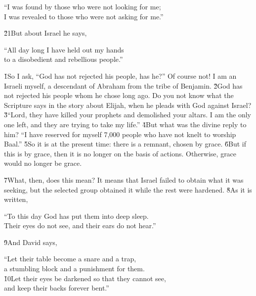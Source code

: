 \begin{poetry}
\poeml ``I was found by those who were not looking for me; \\
\poemll    I was revealed to those who were not asking for me.''
\end{poetry}

\v{21}But about Israel he says,

\begin{poetry}
\poeml ``All day long I have held out my hands \\
\poemll    to a disobedient and rebellious people.''
\end{poetry}

\v{1}So I ask, ``God has not rejected his people, has he?'' Of course not! I am an Israeli myself, a descendant of Abraham from the tribe of Benjamin. \v{2}God has not rejected his people whom he chose long ago. Do you not know what the Scripture says in the story about Elijah, when he pleads with God against Israel? \v{3}``Lord, they have killed your prophets and demolished your altars. I am the only one left, and they are trying to take my life.'' \v{4}But what was the divine reply to him? ``I have reserved for myself 7,000 people who have not knelt to worship Baal.'' \v{5}So it is at the present time: there is a remnant, chosen by grace. \v{6}But if this is by grace, then it is no longer on the basis of actions. Otherwise, grace would no longer be grace.

\v{7}What, then, does this mean? It means that Israel failed to obtain what it was seeking, but the selected group obtained it while the rest were hardened. \v{8}As it is written,

\begin{poetry}
\poeml ``To this day God has put them into deep sleep. \\
\poemll    Their eyes do not see, and their ears do not hear.''
\end{poetry}

\v{9}And David says,

\begin{poetry}
\poeml ``Let their table become a snare and a trap, \\
\poemll    a stumbling block and a punishment for them. \\
\poeml \v{10}Let their eyes be darkened so that they cannot see, \\
\poemll    and keep their backs forever bent.''
\end{poetry}

